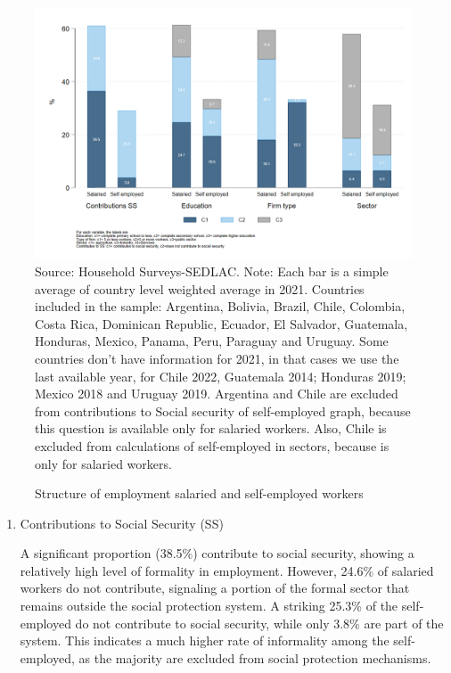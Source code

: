 \documentclass[english]{article}
\begin{document}
\begin{enumerate}
\begin{figure}[h!tbp]
        \centering
        \caption{Structure of employment salaried and self-employed workers}     
        \includegraphics[scale=.3]{latex/figures/Snapshot/Snapshot salaried and self-employed.png}
        \label{fig:employmentbars}
\justifying
\footnotesize{Source: Household Surveys-SEDLAC.}
\footnotesize{Note: Each bar is a simple average of country level weighted average in 2021. Countries included in the sample: Argentina, Bolivia, Brazil, Chile, Colombia, Costa Rica, Dominican Republic, Ecuador, El Salvador, Guatemala, Honduras, Mexico, Panama, Peru, Paraguay and Uruguay. Some countries don’t have information for 2021, in that cases we use the last available year, for Chile 2022, Guatemala 2014; Honduras 2019; Mexico 2018 and Uruguay 2019. Argentina and Chile are excluded from contributions to Social security of self-employed graph, because this question is available only for salaried workers. Also, Chile is excluded from calculations of self-employed in sectors, because is only for salaried workers.}

\end{figure}

\begin{enumerate}

\item Contributions to Social Security (SS)

A significant proportion (38.5\%) contribute to social security, showing a relatively high level of formality in employment. However, 24.6\% of salaried workers do not contribute, signaling a portion of the formal sector that remains outside the social protection system. A striking 25.3\% of the self-employed do not contribute to social security, while only 3.8\% are part of the system. This indicates a much higher rate of informality among the self-employed, as the majority are excluded from social protection mechanisms.


\end{enumerate}
\end{enumerate}
\end{document}
